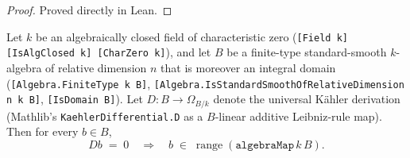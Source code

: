 \begin{proof}
  Proved directly in Lean.
\end{proof}

\begin{theorem}\leanok
[(ii-\(\beta\)-core ring-side) Kernel of the universal K\"ahler derivation: \(D b = 0\) implies \(b\) in the image of the base field]
  \label{lem:KaehlerDifferential_mem_range_algebraMap_of_D_eq_zero}
  Let \(k\) be an algebraically closed field of characteristic zero (\texttt{[Field k] [IsAlgClosed k] [CharZero k]}), and let \(B\) be a finite-type standard-smooth \(k\)-algebra of relative dimension \(n\) that is moreover an integral domain (\texttt{[Algebra.FiniteType k B]}, \texttt{[Algebra.IsStandardSmoothOfRelativeDimension n k B]}, \texttt{[IsDomain B]}). Let \(D \colon B \to \Omega_{B/k}\) denote the universal K\"ahler derivation (Mathlib's \texttt{KaehlerDifferential.D} as a \(B\)-linear additive Leibniz-rule map). Then for every \(b \in B\),
  \[
    D b \;=\; 0 \quad\Longrightarrow\quad b \;\in\; \operatorname{range}(\mathtt{algebraMap}\,k\,B).
  \]
\end{theorem}

